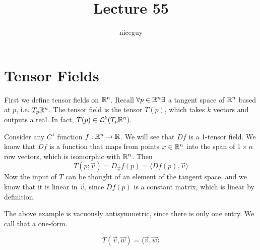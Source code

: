 \documentclass[12pt]{article}
\title{Lecture 55}
\author{niceguy}
\begin{document}
\maketitle

\section{Tensor Fields}

First we define tensor fields on $\mathbb{R}^n$. Recall $\forall p \in \mathbb{R}^n \exists$ a tangent space of $\mathbb{R}^n$ based at $p$, i.e. $T_p\mathbb{R}^n$. The tensor field is the tensor $T(p)$, which takes $k$ vectors and outputs a real. In fact, $T(p) \in \mathcal L^k(T_p\mathbb{R}^n)$.

\begin{ex}
    Consider any $C^1$ function $f:\mathbb{R}^n\rightarrow\mathbb{R}$. We will see that $Df$ is a 1-tensor field. We know that $Df$ is a function that maps from points $x \in \mathbb{R}^n$ into the span of $1 \times n$ row vectors, which is isomorphic with $\mathbb{R}^n$. Then
    $$T(p;\vec v) = D_{\vec v}f(p) = \langle Df(p), \vec v\rangle$$
    Now the input of $T$ can be thought of an element of the tangent space, and we know that it is linear in $\vec v$, since $Df(p)$ is a constant matrix, which is linear by definition.
\end{ex}

The above example is vacuously antisymmetric, since there is only one entry. We call that a one-form.

\begin{ex}
    $$T(\vec v, \vec w) = \langle \vec v, \vec w \rangle$$
\end{ex}
\end{document}
